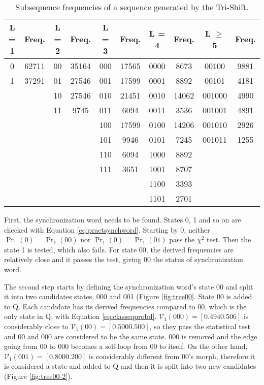{\begin{table}
\centering
\begin{tabular}{|c|c|c|c|c|c|c|c|c|c|}
\hline
\textbf{L = 1} & \textbf{Freq.} & \textbf{L = 2} & \textbf{Freq.} & \textbf{L = 3} & \textbf{Freq.} & \textbf{L = 4} & \textbf{Freq.}& \textbf{L $\geq$ 5} & \textbf{Freq.}\\
\hline
0 & 62711 & 00 & 35164 & 000 & 17565 & 0000 & 8673 & 00100 & 9881\\
1 & 37291 & 01 & 27546 & 001 & 17599 & 0001 & 8892 & 00101 & 4181\\
  &      & 10 & 27546 & 010 & 21451 & 0010 & 14062 & 001000 & 4990\\
  &      & 11 & 9745 & 011 & 6094 & 0011 & 3536 & 001001 & 4891\\
  &	     &    &      & 100 & 17599 & 0100 & 14206 & 001010 & 2926\\
  &      &    &      & 101 & 9946 & 0101 & 7245 & 001011 & 1255\\
  &      &    &      & 110 & 6094 & 1000 & 8892 &        &     \\
  &      &    &      & 111 & 3651 & 1001 & 8707 &        &     \\
  &      &    &      &     &      & 1100 & 3393 &        &     \\
  &      &    &      &     &      & 1101 & 2701 &        &     \\
\hline
\end{tabular}\caption{Subsequence frequencies of a sequence generated by the Tri-Shift. \label{tab:trishiftsub}}
\end{table}

First, the synchronization word needs to be found. States 0, 1 and so on are checked with Equation \ref{eq:practsynchword}. Starting by 0, neither $\Pr_1(0) = \Pr_1(00)$ nor $\Pr_1(0) = \Pr_1(01)$ pass the $\chi^2$ test. Then the state 1 is tested, which also fails. For state 00, the derived frequencies are relatively close and it passes the test, giving 00 the status of synchronization word.

The second step starts by defining the synchronization word's state 00 and split it into two candidates states, 000 and 001 (Figure \ref{fig:tree00}. State 00 is added to Q. Each candidate has its derived frequencies compared to 00, which is the only state in Q, with Equation \ref{eq:classeqprobd}. $\mathcal{V}_1(000) = [0.494 0.506]$ is considerably close to $\mathcal{V}_1(00) = [0.500 0.500]$, so they pass the statistical test and 00 and 000 are considered to be the same state. 000 is removed and the edge going from 00 to 000 becomes a self-loop from 00 to itself. On the other hand, $\mathcal{V}_1(001) = [0.800 0.200]$ is considerably different from 00's morph, therefore it is considered a state and added to Q and then it is split into two new candidates (Figure \ref{fig:tree00-2}).

}
